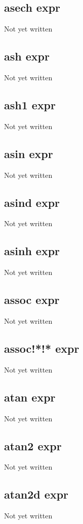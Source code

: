 \documentclass[a4paper,11pt]{article}
\begin{document}
{\subsection{\ttfamily asech expr}
Not yet written

\subsection{\ttfamily ash expr}
Not yet written

\subsection{\ttfamily ash1 expr}
Not yet written

\subsection{\ttfamily asin expr}
Not yet written

\subsection{\ttfamily asind expr}
Not yet written

\subsection{\ttfamily asinh expr}
Not yet written

\subsection{\ttfamily assoc expr}
Not yet written

\subsection{\ttfamily assoc!*!* expr}
Not yet written

\subsection{\ttfamily atan expr}
Not yet written

\subsection{\ttfamily atan2 expr}
Not yet written

\subsection{\ttfamily atan2d expr}
Not yet written

}
\end{document}
